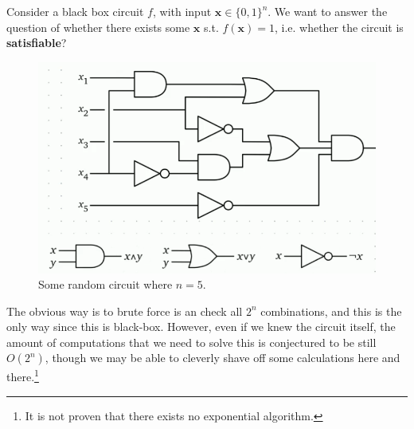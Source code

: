 \documentclass{article}
\begin{document}
    \begin{definition}[CircuitSAT]
      Consider a black box circuit $f$, with input $\mathbf{x} \in \{0, 1\}^n$. We want to answer the question of whether there exists some $\mathbf{x}$ s.t. $f(\mathbf{x}) = 1$, i.e. whether the circuit is \textbf{satisfiable}? 

      \begin{figure}[H]
        \centering 
        \includegraphics[scale=0.4]{img/circuit.png}
        \caption{Some random circuit where $n = 5$.} 
        \label{fig:random_circuit}
      \end{figure}
      The obvious way is to brute force is an check all $2^n$ combinations, and this is the only way since this is black-box. However, even if we knew the circuit itself, the amount of computations that we need to solve this is conjectured to be still $O(2^n)$, though we may be able to cleverly shave off some calculations here and there.\footnote{It is not proven that there exists no exponential algorithm.}
    \end{definition}
\end{document}
